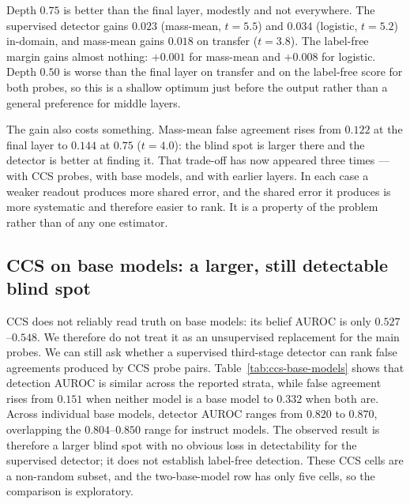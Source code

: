 Depth $0.75$ is better than the final layer, modestly and not everywhere. The
supervised detector gains $0.023$ (mass-mean, $t=5.5$) and $0.034$ (logistic,
$t=5.2$) in-domain, and mass-mean gains $0.018$ on transfer ($t=3.8$). The
label-free margin gains almost nothing: $+0.001$ for mass-mean and $+0.008$ for
logistic. Depth $0.50$ is worse than the final layer on transfer and on the
label-free score for both probes, so this is a shallow optimum just before the
output rather than a general preference for middle layers.

The gain also costs something. Mass-mean false agreement rises from $0.122$ at
the final layer to $0.144$ at $0.75$ ($t=4.0$): the blind spot is larger there
and the detector is better at finding it. That trade-off has now appeared three
times --- with CCS probes, with base models, and with earlier layers. In each
case a weaker readout produces more shared error, and the shared error it
produces is more systematic and therefore easier to rank. It is a property of
the problem rather than of any one estimator.

\subsection{CCS on base models: a larger, still detectable blind spot}

CCS does not reliably read truth on base models: its belief AUROC is only
$0.527$--$0.548$. We therefore do not treat it as an unsupervised replacement
for the main probes. We can still ask whether a supervised third-stage detector
can rank false agreements produced by CCS probe pairs. Table~\ref{tab:ccs-base-models}
shows that detection AUROC is similar across the reported strata, while false
agreement rises from $0.151$ when neither model is a base model to $0.332$ when
both are. Across individual base models, detector AUROC ranges from $0.820$ to
$0.870$, overlapping the $0.804$--$0.850$ range for instruct models. The
observed result is therefore a larger blind spot with no obvious loss in
detectability for the supervised detector; it does not establish label-free
detection. These CCS cells are a non-random subset, and the two-base-model row
has only five cells, so the comparison is exploratory.


